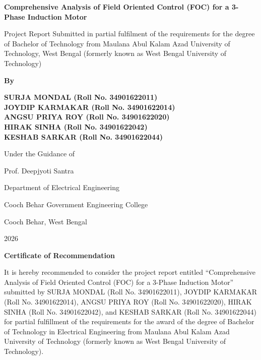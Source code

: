 \documentclass[12pt,a4paper]{report}
\begin{document}
\begin{titlepage}
\begin{center}
{\fontsize{28}{34}\selectfont\bfseries Comprehensive Analysis of Field Oriented Control (FOC) for a 3-Phase Induction Motor\par}
\vspace{1.5cm}
{\fontsize{14}{17}\selectfont Project Report Submitted in partial fulfilment of the requirements for the degree of Bachelor of Technology from Maulana Abul Kalam Azad University of Technology, West Bengal (formerly known as West Bengal University of Technology)\par}
\vspace{1.5cm}
{\Large \bfseries By\par}
\vspace{0.5cm}
{\fontsize{18}{22}\selectfont\bfseries
SURJA MONDAL (Roll No. 34901622011)\\
JOYDIP KARMAKAR (Roll No. 34901622014)\\
ANGSU PRIYA ROY (Roll No. 34901622020)\\
HIRAK SINHA (Roll No. 34901622042)\\
KESHAB SARKAR (Roll No. 34901622044)\par}
\vspace{1.5cm}
{\fontsize{16}{19}\selectfont Under the Guidance of\par}
\vspace{0.5cm}
{\fontsize{16}{19}\selectfont Prof. Deepjyoti Santra\par}
\vfill
{\Large Department of Electrical Engineering\par}
{\Large Cooch Behar Government Engineering College\par}
{\Large Cooch Behar, West Bengal\par}
{\Large 2026\par}
\end{center}
\end{titlepage}

\newpage
\begin{center}
{\Large \bfseries Certificate of Recommendation\par}
\end{center}
\vspace{1cm}
It is hereby recommended to consider the project report entitled ``Comprehensive Analysis of Field Oriented Control (FOC) for a 3-Phase Induction Motor'' submitted by SURJA MONDAL (Roll No. 34901622011), JOYDIP KARMAKAR (Roll No. 34901622014), ANGSU PRIYA ROY (Roll No. 34901622020), HIRAK SINHA (Roll No. 34901622042), and KESHAB SARKAR (Roll No. 34901622044) for partial fulfillment of the requirements for the award of the degree of Bachelor of Technology in Electrical Engineering from Maulana Abul Kalam Azad University of Technology (formerly known as West Bengal University of Technology).
\vspace{3cm}
\end{document}

